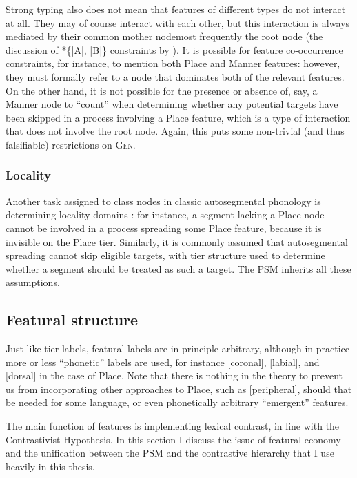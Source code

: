 Strong typing also does not mean that features of different types do not interact at all. They may of course interact with each other, but this interaction is always mediated by their common mother node\dash most frequently the root node (\cf the discussion of *\{|A|, |B|\} constraints by \citealt[\S2.5]{blaho-diss}). It is possible for feature co\hyp occurrence constraints, for instance, to mention both Place and Manner features: however, they must formally refer to a node that dominates both of the relevant features. On the other hand, it is not possible for the presence or absence of, say, a Manner node to \enquote{count} when determining whether any potential targets have been skipped in a process involving a Place feature, which is a type of interaction that does not involve the root node. Again, this puts some non\hyp trivial (and thus falsifiable) restrictions on \textsc{Gen}.

\subsubsection{Locality}
\label{sec:locality}

Another task assigned to class nodes in classic autosegmental phonology is determining locality domains \citep[\egm][]{avery-rice,odden94:_adjac}: for instance, a segment lacking a Place node cannot be involved in a process spreading some Place feature, because it is invisible on the Place tier. Similarly, it is commonly assumed that autosegmental spreading cannot skip eligible targets, with tier structure used to determine whether a segment should be treated as such a target. The PSM inherits all these assumptions.

\subsection{Featural structure}
\label{sec:featural-structure}

Just like tier labels, featural labels are in principle arbitrary, although in practice more or less \enquote{phonetic} labels are used, for instance [coronal], [labial], and [dorsal] in the case of Place. Note that there is nothing in the theory to prevent us from incorporating other approaches to Place, such as  [peripheral], should that be needed for some language, or even phonetically arbitrary \enquote{emergent} features.

The main function of features is implementing lexical contrast, in line with the Contrastivist Hypothesis. In this section I discuss the issue of featural economy and the unification between the PSM and the contrastive hierarchy that I use heavily in this thesis.

